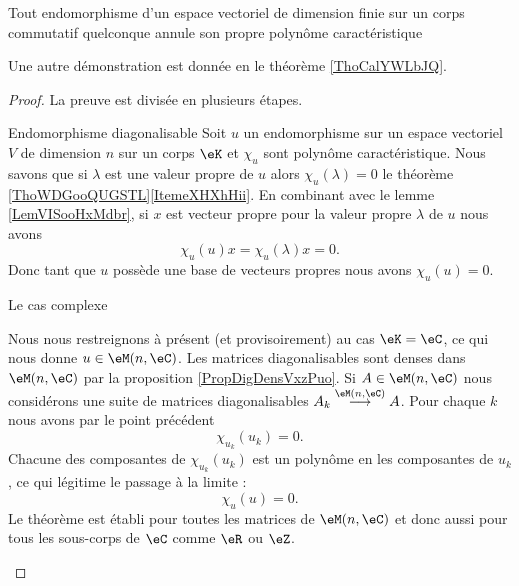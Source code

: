 \begin{theorem}  \label{ThoHZTooWDjTYI}
    Tout endomorphisme d'un espace vectoriel de dimension finie sur un corps commutatif quelconque annule son propre polynôme caractéristique
\end{theorem}

Une autre démonstration est donnée en le théorème \ref{ThoCalYWLbJQ}.
\begin{proof}
    La preuve est divisée en plusieurs étapes.
    \begin{subproof}
        \item[Endomorphisme diagonalisable]
            Soit \( u\) un endomorphisme sur un espace vectoriel \( V\) de dimension \( n\) sur un corps \( \eK\) et \( \chi_u\) sont polynôme caractéristique. Nous savons que si \( \lambda\) est une valeur propre de \( u\) alors \( \chi_u(\lambda)=0\) le théorème \ref{ThoWDGooQUGSTL}\ref{ItemeXHXhHii}. En combinant avec le lemme \ref{LemVISooHxMdbr}, si \( x\) est vecteur propre pour la valeur propre \( \lambda\) de \( u\) nous avons
            \begin{equation}
                \chi_u(u)x=\chi_u(\lambda)x=0.
            \end{equation}
            Donc tant que \( u\) possède une base de vecteurs propres nous avons \( \chi_u(u)=0\).

        \item[Le cas complexe]

            Nous nous restreignons à présent (et provisoirement) au cas \( \eK=\eC\), ce qui nous donne \( u\in \eM(n,\eC)\). Les matrices diagonalisables sont denses dans \( \eM(n,\eC)\) par la proposition \ref{PropDigDensVxzPuo}. Si \( A\in \eM(n,\eC)\) nous considérons une suite de matrices diagonalisables \( A_k\stackrel{\eM(n,\eC)}{\longrightarrow}A\). Pour chaque \( k\) nous avons par le point précédent 
            \begin{equation}
                \chi_{u_k}(u_k)=0.
            \end{equation}
            Chacune des composantes de \( \chi_{u_k}(u_k)\) est un polynôme en les composantes de \( u_k\), ce qui légitime le passage à la limite :
            \begin{equation}
                \chi_u(u)=0.
            \end{equation}
            Le théorème est établi pour toutes les matrices de \( \eM(n,\eC)\) et donc aussi pour tous les sous-corps de \( \eC\) comme \( \eR\) ou \( \eZ\).


\end{subproof}
\end{proof}
